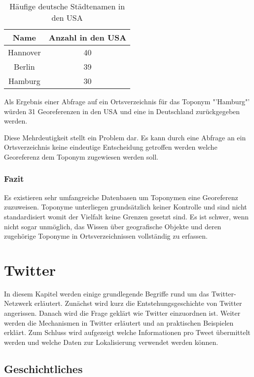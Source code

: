 				\begin{table}[htpb]
					\caption{Häufige deutsche Städtenamen in den USA} 
					\centering
					\begin{tabular}{|c|c|}
						\hline
						Name & Anzahl in den USA \\
						\hline\hline
						Hannover & 40 \\
						\hline
						Berlin & 39 \\
						\hline
						Hamburg & 30 \\
						\hline
					\end{tabular}
					\label{tab:usCitiesGermanNames} 
				\end{table}

				Als Ergebnis einer Abfrage auf ein Ortsverzeichnis für das Toponym "'Hamburg"' würden 31 Georeferenzen in den USA und eine in Deutschland zurückgegeben werden. 

				Diese Mehrdeutigkeit stellt ein Problem dar.
				Es kann durch eine Abfrage an ein Ortsverzeichnis keine eindeutige Entscheidung getroffen werden welche Georeferenz dem Toponym zugewiesen werden soll. 

			\subsubsection{Fazit}

				Es existieren sehr umfangreiche Datenbasen um Toponymen eine Georeferenz zuzuweisen. 
				Toponyme unterliegen grundsätzlich keiner Kontrolle und sind nicht standardisiert womit der Vielfalt keine Grenzen gesetzt sind.
				Es ist schwer, wenn nicht sogar unmöglich, das Wissen über geografische Objekte und deren zugehörige Toponyme in Ortsverzeichnissen vollständig zu erfassen.

	\section{Twitter} 
	
		In diesem Kapitel werden einige grundlegende Begriffe rund um das Twitter-Netzwerk erläutert. 
		Zunächst wird kurz die Entstehungsgeschichte von Twitter angerissen.
		Danach wird die Frage geklärt wie Twitter einzuordnen ist.
		Weiter werden die Mechanismen in Twitter erläutert und an praktischen Beispielen erklärt. 
		Zum Schluss wird aufgezeigt welche Informationen pro Tweet übermittelt werden und welche Daten zur Lokalisierung verwendet werden können.

		\subsection{Geschichtliches}
			
